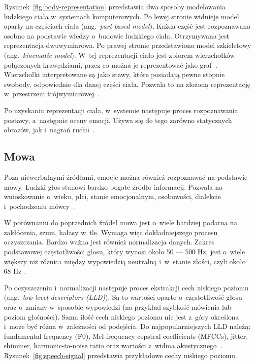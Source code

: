 Rysunek~\ref{fig:body-representation} przedstawia dwa sposoby modelowania ludzkiego ciała w~systemach komputerowych.
Po lewej stronie widnieje model oparty na częściach ciała (ang.~\textit{part based model}).
Każda część jest rozpoznawana osobno na podstawie wiedzy o~budowie ludzkiego ciała.
Otrzymywana jest reprezentacja dwuwymiarowa.
Po prawej stronie przedstawiono model szkieletowy (ang.~\textit{kinematic model}).
W~tej reprezentacji ciało jest zbiorem wierzchołków połączonych krawędziami, przez co można je reprezentować jako graf~\cite{Noroozi2021}.
Wierzchołki interpretowane są jako stawy, które posiadają pewne stopnie swobody, odpowiednie dla danej części ciała.
Pozwala to na złożoną reprezentację w~przestrzeni trójwymiarowej~\cite{Calvo2015}.

Po uzyskaniu reprezentacji ciała, w~systemie następuje proces rozpoznawania postawy, a~następnie oceny emocji.
Używa się do tego zarówno statycznych obrazów, jak i~nagrań ruchu~\cite{Noroozi2021, Kleinsmith2013}.


\subsection{Mowa}\label{subsec:mowa}

Poza niewerbalnymi źródłami, emocje można również rozpoznawać na podstawie mowy.
Ludzki głos stanowi bardzo bogate źródło informacji.
Pozwala na wnioskowanie o~wieku, płci, stanie emocjonalnym, osobowości, dialekcie i~pochodzeniu mówcy~\cite{Wani2021}.

W porównaniu do poprzednich źródeł mowa jest o~wiele bardziej podatna na zakłócenia, szum, hałasy w~tle.
Wymaga więc dokładniejszego procesu oczyszczania.
Bardzo ważna jest również normalizacja danych.
Zakres podstawowej częstotliwości głosu, który wynosi około 50 — 500 Hz, jest o~wiele większy niż różnica między wypowiedzią neutralną i~w~stanie złości, czyli około 68 Hz~\cite{Calvo2015}.

Po oczyszczeniu i~normalizacji następuje proces ekstrakcji cech niskiego poziomu (ang.~\textit{low-level descriptors (LLD)}).
Są to wartości oparte o~częstotliwość głosu oraz o~zmiany w~sposobie wypowiedzi (na przykład szybkość mówienia lub poziom głośności).
Sama ilość cech niskiego poziomu nie jest z~góry określona i~może być różna w~zależności od podejścia.
Do najpopularniejszych LLD należą: fundamental frequency (F0), Mel-frequency cepstral coefficients (MFCCs), jitter, shimmer, harmonic-to-noise ratio oraz wartości z~widma akustycznego~\cite{Calvo2015, Abdelwahab2014}.
Rysunek~\ref{fig:speech-signal} przedstawia przykładowe cechy niskiego poziomu.

